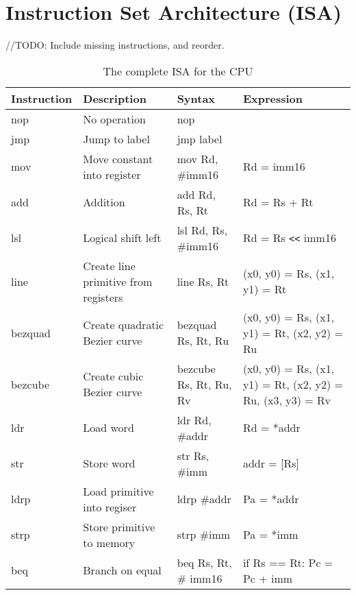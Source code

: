 \chapter{Instruction Set Architecture (ISA)}
\label{app:isa}
//TODO: Include missing instructions, and reorder.
\begin{table}[H]
    \begin{tabular}{|p{2.1cm}|p{4cm}|p{4cm}|p{3cm}|}
    \hline
    \textbf{Instruction} & \textbf{Description}        & \textbf{Syntax}        & \textbf{Expression}                                                 \\ \hline
    nop         & No operation                         & nop                    & ~                                                          \\ \hline
    jmp         & Jump to label                        & jmp label              & ~                                                          \\ \hline
    mov         & Move constant into register          & mov Rd, \#imm16        & Rd = imm16                                                 \\ \hline
    add         & Addition                             & add Rd, Rs, Rt         & Rd = Rs + Rt                                               \\ \hline
    lsl         & Logical shift left                   & lsl Rd, Rs, \#imm16    & Rd = Rs \verb|<<| imm16                                           \\ \hline
    line        & Create line primitive from registers & line Rs, Rt            & (x0, y0) = Rs, (x1, y1) = Rt                               \\ \hline
    bezquad     & Create quadratic Bezier curve        & bezquad Rs, Rt, Ru     & (x0, y0) = Rs, (x1, y1) = Rt, (x2, y2) = Ru                \\ \hline
    bezcube     & Create cubic Bezier curve            & bezcube Rs, Rt, Ru, Rv & (x0, y0) = Rs, (x1, y1) = Rt, (x2, y2) = Ru, (x3, y3) = Rv \\ \hline
    ldr         & Load word                            & ldr Rd, \#addr         & Rd = *addr                                                 \\ \hline
    str         & Store word                           & str Rs, \#imm          & addr = [Rs]                                                \\ \hline
    ldrp        & Load primitive into regiser          & ldrp \#addr            & Pa = *addr                                                 \\ \hline
    strp        & Store primitive to memory            & strp \#imm             & Pa = *imm                                                  \\ \hline
    beq         & Branch on equal                      & beq Rs, Rt, \# imm16   & if Rs == Rt: Pc = Pc + imm                            \\ \hline
    \end{tabular}
    \caption{The complete ISA for the CPU}
\end{table}
